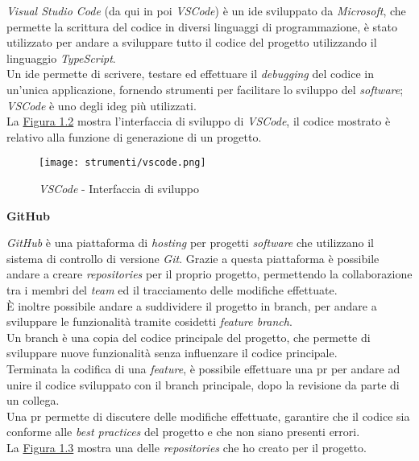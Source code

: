\noindent \textit{Visual Studio Code} (da qui in poi \textit{VSCode}) è un \gls{ide} sviluppato da \textit{Microsoft}, che permette la scrittura del codice in diversi linguaggi di programmazione, è stato utilizzato per andare
a sviluppare tutto il codice del progetto utilizzando il linguaggio \textit{TypeScript}.\\
Un \gls{ide} permette di scrivere, testare ed effettuare il \textit{debugging} del codice in un'unica applicazione, fornendo strumenti per facilitare lo sviluppo del \textit{software}; \textit{VSCode} è uno degli \gls{ideg} più utilizzati.\\
La {\hyperref[fig:vscode]{Figura 1.2}} mostra l'interfaccia di sviluppo di \textit{VSCode}, il codice mostrato è relativo alla funzione di generazione di un progetto.

\begin{figure}[H]
    \label{fig:vscode}
    \centering
    \texttt{[image: strumenti/vscode.png]}
    \caption{\textit{VSCode} - Interfaccia di sviluppo}
\end{figure}

\noindent \textbf{GitHub\\}

\noindent \textit{GitHub} è una piattaforma di \textit{hosting} per progetti \textit{software} che utilizzano il sistema di controllo di versione \textit{Git}.
Grazie a questa piattaforma è possibile andare a creare \textit{repositories} per il proprio progetto, permettendo la collaborazione tra i membri del \textit{team} ed il tracciamento delle modifiche effettuate. \\
È inoltre possibile andare a suddividere il progetto in \gls{branch}, per andare a sviluppare le funzionalità tramite cosidetti \textit{feature branch}.\\
Un \gls{branch} è una copia del codice principale del progetto, che permette di sviluppare nuove funzionalità senza influenzare il codice principale.\\
Terminata la codifica di una \textit{feature}, è possibile effettuare una \gls{pr} per andare ad unire il codice sviluppato con il \gls{branch} principale, dopo la revisione da parte di un collega.\\
Una \gls{pr} permette di discutere delle modifiche effettuate, garantire che il codice sia conforme alle \textit{best practices} del progetto e che non siano presenti errori.\\
La {\hyperref[fig:github]{Figura 1.3}} mostra una delle \textit{repositories} che ho creato per il progetto.

